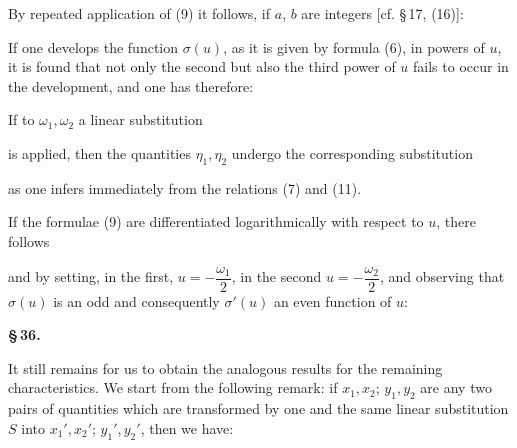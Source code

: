 By repeated application of (9) it follows, if $a$, $b$ are integers [cf. \S\,17, (16)]:

If one develops the function $\sigma(u)$, as it is given by formula (6), in powers of $u$, it is found that not only the second but also the third power of $u$ fails to occur in the development, and one has therefore:

If to $\omega_1, \omega_2$ a linear substitution

is applied, then the quantities $\eta_1, \eta_2$ undergo the corresponding substitution

as one infers immediately from the relations (7) and (11).

If the formulae (9) are differentiated logarithmically with respect to $u$, there follows

and by setting, in the first, $u=-\dfrac{\omega_1}{2}$, in the second $u=-\dfrac{\omega_2}{2}$, and observing that $\sigma(u)$ is an odd and consequently $\sigma'(u)$ an even function of $u$:


\begin{center}
\textbf{\S\,36. }
\end{center}

It still remains for us to obtain the analogous results for the remaining characteristics. We start from the following remark: if $x_1, x_2$; $y_1, y_2$ are any two pairs of quantities which are transformed by one and the same linear substitution $S$ into $x_1', x_2'$; $y_1', y_2'$, then we have:
